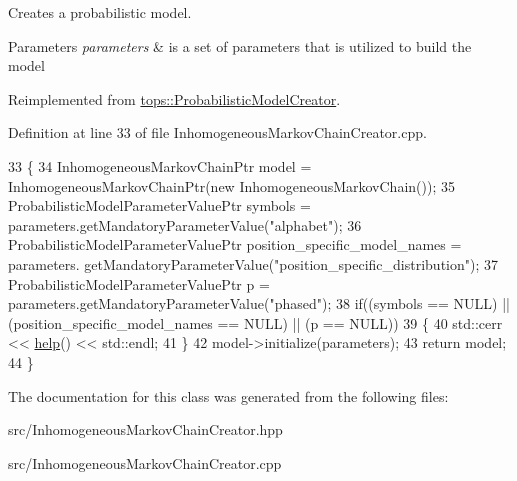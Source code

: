 Creates a probabilistic model. 


\begin{DoxyParams}{Parameters}
{\em parameters} & is a set of parameters that is utilized to build the model \\
\hline
\end{DoxyParams}


Reimplemented from \hyperlink{classtops_1_1ProbabilisticModelCreator_afed6c8ffa45fff446bdaa8b533da8f7c}{tops\+::\+Probabilistic\+Model\+Creator}.



Definition at line 33 of file Inhomogeneous\+Markov\+Chain\+Creator.\+cpp.


\begin{DoxyCode}
33                                                                                                            
          \{
34     InhomogeneousMarkovChainPtr model = InhomogeneousMarkovChainPtr(\textcolor{keyword}{new} InhomogeneousMarkovChain());
35     ProbabilisticModelParameterValuePtr symbols = parameters.getMandatoryParameterValue(\textcolor{stringliteral}{"alphabet"});
36     ProbabilisticModelParameterValuePtr position\_specific\_model\_names = parameters.
      getMandatoryParameterValue(\textcolor{stringliteral}{"position\_specific\_distribution"});
37     ProbabilisticModelParameterValuePtr p = parameters.getMandatoryParameterValue(\textcolor{stringliteral}{"phased"});
38     \textcolor{keywordflow}{if}((symbols == NULL) || (position\_specific\_model\_names == NULL) || (p == NULL))
39       \{
40         std::cerr << \hyperlink{classtops_1_1InhomogeneousMarkovChainCreator_a39fee4292cf30c58825df39e431fd121}{help}() << std::endl;
41       \}
42     model->initialize(parameters);
43     \textcolor{keywordflow}{return} model;
44   \}
\end{DoxyCode}


The documentation for this class was generated from the following files\+:\begin{DoxyCompactItemize}
\item 
src/Inhomogeneous\+Markov\+Chain\+Creator.\+hpp\item 
src/Inhomogeneous\+Markov\+Chain\+Creator.\+cpp\end{DoxyCompactItemize}
